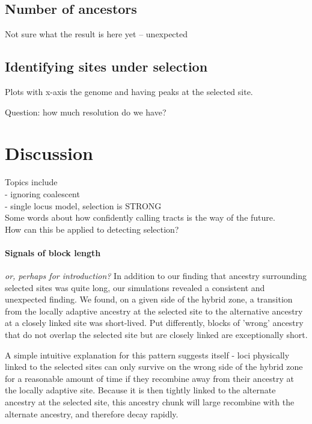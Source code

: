 \documentclass[12pt]{article}
\newcommand{\plr}[1]{{\em \color{blue} #1}}
\begin{document}
\subsection*{Number of ancestors}
Not sure what the result is here yet -- unexpected

\subsection*{Identifying sites under selection}

Plots with x-axis the genome and having peaks at the selected site.

Question: how much resolution do we have?

\section{Discussion}
Topics include\\
- ignoring coalescent\\
- single locus model, selection is STRONG\\

Some words about how confidently calling tracts is the way of the future.\\
How can this be applied to detecting selection?

\paragraph{Signals of block length}
\plr{or, perhaps for introduction?}
In addition to our finding that ancestry surrounding selected sites was quite long, our simulations revealed a consistent and unexpected finding. We found, on a given side of the hybrid zone, a transition from the locally adaptive ancestry at the selected site to the alternative ancestry at a closely linked site was short-lived. Put differently, blocks of 'wrong' ancestry that do not overlap the selected site but are closely linked are exceptionally short. 

A simple intuitive explanation for this pattern suggests itself - loci physically linked to the selected sites can only survive on the wrong side of the hybrid zone for a reasonable amount of time if they recombine away from their ancestry at the locally adaptive site. Because it is then tightly linked to the alternate ancestry at the selected site, this ancestry chunk will large recombine with the alternate ancestry, and therefore decay rapidly.
\end{document}
